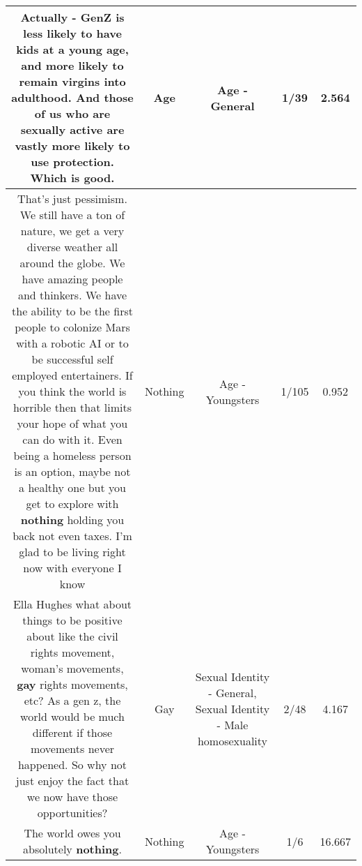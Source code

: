 \documentclass[11pt]{article}
\newlength\mylength
\begin{document}
\begin{center}
\begin{longtable}{|C{.65\mylength}|C{.30\mylength}|C{.12\mylength}|C{.12\mylength}|C{.12\mylength}|}
  \small Actually - GenZ is less likely to have kids at a young \textbf{age}, and more likely to remain virgins into adulthood. And those of us who are sexually active are vastly more likely to use protection. Which is good.\normalsize   & Age & Age - General & 1/39 & 2.564 \\  \hline
  \small That's just pessimism. We still have a ton of nature, we get a very diverse weather all around the globe. We have amazing people and thinkers. We have the ability to be the first people to colonize Mars with a robotic AI or to be successful self employed entertainers. If you think the world is horrible then that limits your hope of what you can do with it. Even being a homeless person is an option, maybe not a healthy one but you get to explore with \textbf{nothing} holding you back not even taxes. I'm glad to be living right now with everyone I know\normalsize   & Nothing & Age - Youngsters & 1/105 & 0.952 \\  \hline
  \small Ella Hughes what about things to be positive about like the civil rights movement, woman's movements, \textbf{g\textbf{ay}} rights movements, etc? As a gen z, the world would be much different if those movements never happened. So why not just enjoy the fact that we now have those opportunities?\normalsize   & Gay & Sexual Identity - General, Sexual Identity - Male homosexuality & 2/48 & 4.167 \\  \hline
  \small The world owes you absolutely \textbf{nothing}.\normalsize   & Nothing & Age - Youngsters & 1/6 & 16.667 \\  \hline

\end{longtable}
\end{center}
\end{document}
